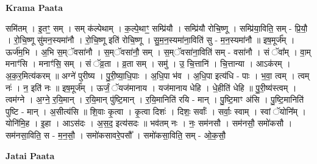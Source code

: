 \documentclass[17pt]{extarticle}
\begin{document}
\textbf{Krama Paata} \newline

समि॑तम् । इ॒तꣳ॒॒ सम् । सम् क॑ल्पेथाम् । क॒ल्पे॒थाꣳ॒॒ सम्प्रि॑यौ । सम्प्रि॑यौ रोचि॒ष्णू । सम्प्रि॑या॒विति॒ सम् - प्रि॒यौ॒ । रो॒चि॒ष्णू सु॑मन॒स्यमा॑नौ । रो॒चि॒ष्णू इति॑ रोचि॒ष्णू । सु॒म॒न॒स्यमा॑ना॒विति॑ सु - म॒न॒स्यमा॑नौ ॥ इष॒मूर्ज᳚म् । ऊर्ज॑म॒भि । अ॒भि स॒म्ॅवसा॑नौ । स॒म्ॅवसा॑नौ॒ सम् । स॒म्ॅवसा॑ना॒विति॑ सम् - वसा॑नौ । सं ॅवा᳚म् । वा॒म् मनाꣳ॑सि । मनाꣳ॑सि॒ सम् । सं ॅव्र॒ता । व्र॒ता सम् । समु॑ । उ॒ चि॒त्तानि॑ । चि॒त्तान्या । आऽक॑रम् । अ॒क॒र॒मित्य॑करम् ॥ अग्ने॑ पुरीष्य । पु॒री॒ष्या॒धि॒पाः । अ॒धि॒पा भ॑व । अ॒धि॒पा इत्य॑धि - पाः । भ॒वा॒ त्वम् । त्वम् नः॑ । न॒ इति॑ नः ॥ इष॒मूर्ज᳚म् । ऊर्जं॒ ॅयज॑मानाय । यज॑मानाय धेहि । धे॒हीति॑ धेहि ॥ पु॒री॒ष्य॑स्त्वम् । त्वम॑ग्ने । अ॒ग्ने॒ र॒यि॒मान् । र॒यि॒मान् पु॑ष्टि॒मान् । र॒यि॒मानिति॑ रयि - मान् । पु॒ष्टि॒माꣳ अ॑सि । पु॒ष्टि॒मानिति॑ पुष्टि - मान् । अ॒सीत्य॑सि ॥ शि॒वाः कृ॒त्वा । कृ॒त्वा दिशः॑ । दिशः॒ सर्वाः᳚ । सर्वाः॒ स्वाम् । स्वां ॅयोनि᳚म् । योनि॑मि॒ह । इ॒हा । आऽस॑दः । अ॒स॒द॒ इत्य॑सदः ॥ भव॑तम् नः । नः॒ सम॑नसौ । सम॑नसौ॒ समो॑कसौ । सम॑नसा॒विति॒ स - म॒न॒सौ॒ । समो॑कसावरे॒पसौ᳚ । समो॑कसा॒विति॒ सम् - ओ॒क॒सौ॒ \newline

\textbf{Jatai Paata} \newline
\end{document}

